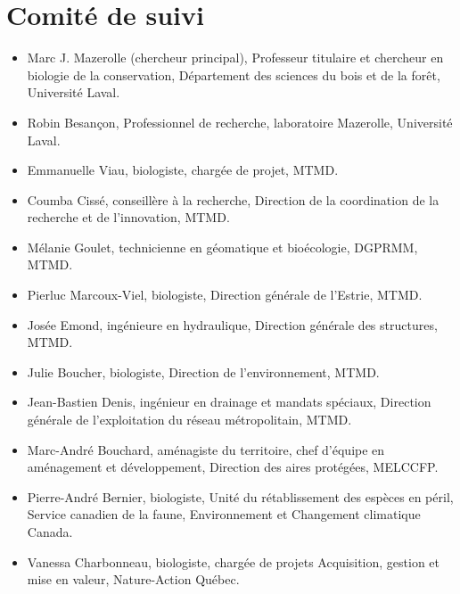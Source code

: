\section*{Comité de suivi}

\begin{itemize}
\item Marc J. Mazerolle (chercheur principal), Professeur titulaire et chercheur en biologie de la conservation, Département des sciences du bois et de la forêt, Université Laval.
\item Robin Besançon, Professionnel de recherche, laboratoire Mazerolle, Université Laval.
\item Emmanuelle Viau, biologiste, chargée de projet, MTMD.
\item Coumba Cissé, conseillère à la recherche, Direction de la coordination de la recherche et de l'innovation, MTMD.
\item Mélanie Goulet, technicienne en géomatique et bioécologie, DGPRMM, MTMD.
\item Pierluc Marcoux-Viel, biologiste, Direction générale de l'Estrie, MTMD.
\item Josée Emond, ingénieure en hydraulique, Direction générale des structures, MTMD.
\item Julie Boucher, biologiste, Direction de l'environnement, MTMD.
\item Jean-Bastien Denis, ingénieur en drainage et mandats spéciaux, Direction générale de l'exploitation du réseau métropolitain, MTMD.
\item Marc-André Bouchard, aménagiste du territoire, chef d'équipe en aménagement et développement, Direction des aires protégées, MELCCFP.
\item Pierre-André Bernier, biologiste, Unité du rétablissement des espèces en péril, Service canadien de la faune, Environnement et Changement climatique Canada.
\item Vanessa Charbonneau, biologiste, chargée de projets Acquisition, gestion et mise en valeur, Nature-Action Québec.
\end{itemize}
